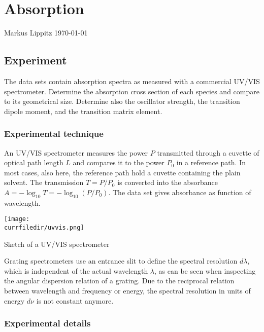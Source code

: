 

\chapter{Absorption}

\vspace*{-12mm}
Markus Lippitz \newline \today
\vspace*{12mm}

\section{Experiment}

The data sets contain absorption spectra as measured with a commercial UV/VIS spectrometer. Determine the absorption cross section of each species and compare to its geometrical size. Determine also the oscillator strength, the transition dipole moment, and the transition matrix element.


\subsection{Experimental technique}

An UV/VIS spectrometer measures the  power $P$ transmitted through a cuvette of optical path length $L$ and compares it to the power $P_0$ in a reference path. In most cases, also here, the reference path hold a cuvette containing  the plain solvent. The transmission $T = P / P_0$ is converted into the absorbance $A = - \log_{10} T = - \log_{10} ( P / P_0)$. The data set gives absorbance as function of wavelength.

\begin{marginfigure}
\texttt{[image: \\currfiledir/uvvis.png]}
\caption{Sketch of a UV/VIS spectrometer}
\end{marginfigure}



Grating spectrometers use an entrance slit to define the spectral resolution $d \lambda$, which is independent of the actual wavelength $\lambda$, as can be seen when inspecting the   angular dispersion relation of a grating. Due to the reciprocal relation between wavelength and frequency or energy, the spectral resolution in units of energy $d \nu$ is not constant anymore.


\subsection{Experimental details}

